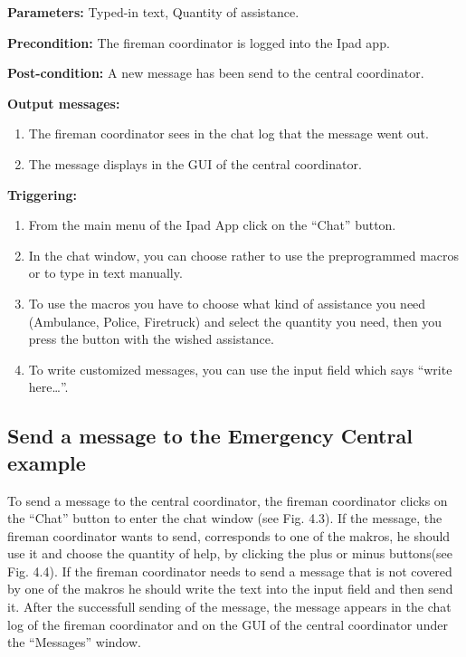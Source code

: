 \begin{description}

\item \textbf{Parameters:} Typed-in text, Quantity of assistance.
\item \textbf{Precondition:} The fireman coordinator is logged into the Ipad
app.
\item \textbf{Post-condition:} A new message has been send to the central
coordinator. 
\item \textbf{Output messages:}
\begin{enumerate}
  \item The fireman coordinator sees in the chat log that the message went out.
  \item The message displays in the GUI of the central coordinator.
\end{enumerate}

\item \textbf{Triggering:}
\begin{enumerate}
  \item From the main menu of the Ipad App click on the “Chat” button.
  \item In the chat window, you can choose rather to use the preprogrammed
  macros or to type in text manually.
  \item To use the macros you have to choose what kind of assistance you need
  (Ambulance, Police, Firetruck) and select the quantity you need, then you
  press the button with the wished assistance.
  \item To write customized messages, you can use the input field which says
  “write here\ldots”.
\end{enumerate}
\end{description}

 
\subsection{Send a message to the Emergency Central example}
To send a message to the central coordinator, the fireman coordinator clicks on
the “Chat” button to enter the chat window (see Fig. 4.3). If the message, the
fireman coordinator wants to send, corresponds to one of the makros, he should
use it and choose the quantity of help, by clicking the plus or minus
buttons(see Fig. 4.4).
If the fireman coordinator needs to send a message that is not
covered by one of the makros he should write the text into the input field and
then send it. After the successfull sending of the message, the message
appears in the chat log of the fireman coordinator and on the GUI of the central
coordinator under the “Messages” window.

